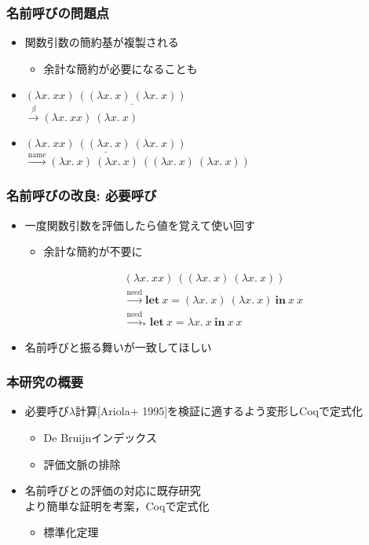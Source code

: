 \documentclass[dvipdfmx,cjk,xcolor=dvipsnames,envcountsect,notheorems,12pt]{beamer}
\theoremstyle{definition}
\newcommand{\LET}[3]{\mathbf{let}~#1=#2~\mathbf{in}~#3}
\newcommand{\FULLBETA}{\xrightarrow{\beta}}
\newcommand{\CALLBYNEED}{\xrightarrow{\mathrm{need}}}
\newcommand{\CALLBYNAME}{\xrightarrow{\mathrm{name}}}
\newcommand{\RTCLOS}[1]{#1_*}
\begin{document}
\begin{frame}
	\frametitle{名前呼びの問題点}
	\begin{itemize}
		\item 関数引数の簡約基が複製される
			\begin{itemize}
				\item 余計な簡約が必要になることも
			\end{itemize}
	\end{itemize}
	\vfill
	\begin{itemize}
		\item $(\lambda x.~xx)~\underline{((\lambda x.~x)~(\lambda x.~x))}$ \\
			$\FULLBETA (\lambda x.~xx)~(\lambda x.~x)$
		\item $\underline{(\lambda x.~xx)~((\lambda x.~x)~(\lambda x.~x))}$ \\
			$\CALLBYNAME (\lambda x.~x)~(\lambda x.~x)~((\lambda x.~x)~(\lambda x.~x))$
	\end{itemize}
\end{frame}

\begin{frame}
	\frametitle{名前呼びの改良: 必要呼び}
	\begin{itemize}
		\item 一度関数引数を評価したら値を覚えて使い回す
			\begin{itemize}
				\item 余計な簡約が不要に
			\end{itemize}
			\[\begin{array}{l}
				(\lambda x.~xx)~((\lambda x.~x)~(\lambda x.~x)) \\
				\CALLBYNEED \LET{x}{(\lambda x.~x)~(\lambda x.~x)}{x~x} \\
				\RTCLOS{\CALLBYNEED} \LET{x}{\lambda x.~x}{x~x}
			\end{array}\]
		\item 名前呼びと振る舞いが一致してほしい
	\end{itemize}
\end{frame}

\begin{frame}
	\frametitle{本研究の概要}
	\begin{itemize}
		\item 必要呼び$\lambda$計算[Ariola+ 1995]を検証に適するよう変形しCoqで定式化
			\begin{itemize}
				\item De Bruijnインデックス
				\item 評価文脈の排除
			\end{itemize}
		\item 名前呼びとの評価の対応に既存研究\\より簡単な証明を考案，Coqで定式化
			\begin{itemize}
				\item 標準化定理
			\end{itemize}
	\end{itemize}
\end{frame}
\end{document}
